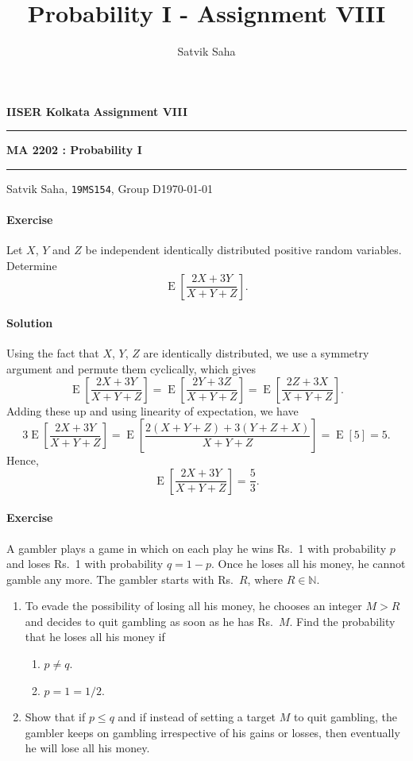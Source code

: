 \documentclass[10pt]{article}
\title{Probability I - Assignment VIII}
\author{Satvik Saha}
\date{}
\newcounter{prob}
\def\problem{\stepcounter{prob}\paragraph{Exercise \arabic{prob}}}
\def\solution{\paragraph{Solution}}
\newcommand\op[1]{\operatorname{#1}}
\newcommand\E[1]{\op{E}\left[#1\right]}
\begin{document}
        \par\textbf{IISER Kolkata} \hfill \textbf{Assignment VIII}
        \vspace{3pt}
        \hrule
        \vspace{3pt}
        \begin{center}
                \LARGE{\textbf{MA 2202 : Probability I}}
        \end{center}
        \vspace{3pt}
        \hrule
        \vspace{3pt}
        Satvik Saha, \texttt{19MS154}, Group D\hfill\today
        \vspace{20pt}

        \problem Let $X$, $Y$ and $Z$ be independent identically distributed
        positive random variables. Determine \[
            \E{\frac{2X + 3Y}{X + Y + Z}}.
        \] 

        \solution Using the fact that $X$, $Y$, $Z$ are identically distributed, we
        use a symmetry argument and permute them cyclically, which gives \[
            \E{\frac{2X + 3Y}{X + Y + Z}} = \E{\frac{2Y + 3Z}{X + Y + Z}} =
            \E{\frac{2Z + 3X}{X + Y + Z}}.
        \] Adding these up and using linearity of expectation, we have \[
            3\E{\frac{2X + 3Y}{X + Y + Z}} = \E{\frac{2(X + Y + Z) + 3(Y + Z + X)}{X
            + Y + Z}} = \E{5} = 5.
        \] Hence, \[
            \E{\frac{2X + 3Y}{X + Y + Z}} = \frac{5}{3}.
        \] 

        \problem A gambler plays a game in which on each play he wins Rs.\ 1 with
        probability $p$ and loses Rs.\ 1 with probability $q = 1 - p$. Once he loses
        all his money, he cannot gamble any more. The gambler starts with Rs.\ $R$,
        where $R \in \mathbb{N}$.

        \begin{enumerate}
            \item To evade the possibility of losing all his money, he chooses an
            integer $M > R$ and decides to quit gambling as soon as he has Rs.\ $M$.
            Find the probability that he loses all his money if 
            \begin{enumerate}
                \item $p \neq q$.
                \item $p = 1 = 1 /2$.
            \end{enumerate}

            \item Show that if $p \leq q$ and if instead of setting a target $M$ to
            quit gambling, the gambler keeps on gambling irrespective of his gains
            or losses, then eventually he will lose all his money.
        \end{enumerate}
\end{document}
